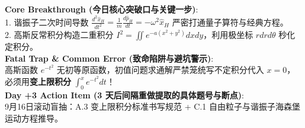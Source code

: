 \documentclass[a4paper,11pt]{article}
\begin{document}
\begin{tcolorbox}[
  enhanced, colback=white, colframe=border, boxrule=0.6pt, arc=2mm,
  left=4mm, right=4mm, top=3.0mm, bottom=3.2mm,
  fonttitle=\sffamily\bfseries\color{slate},
  title={\raisebox{0pt}{\color{forest}\rule{3pt}{10pt}}\hspace{4pt}Key Derivation Insights \& Traps \textbar\ 突破口与避坑沉淀},
  colbacktitle=paper, coltitle=slate,
  titlerule=0pt, toptitle=1.8mm, bottomtitle=1.8mm
]
\sffamily\small
\textbf{Core Breakthrough (今日核心突破口与关键一步)}:\\
1. 谐振子二次时间导数 $\frac{d^2\hat{x}_H}{dt^2} = \frac{1}{m}\frac{d\hat{p}_H}{dt} = -\omega^2 \hat{x}_H$ 严密打通量子算符与经典方程。\\
2. 高斯反常积分构造二重积分 $I^2 = \iint e^{-a(x^2+y^2)}dxdy$，利用极坐标 $rdrd\theta$ 秒化定积分。\\[4pt]
\textbf{Fatal Trap \& Common Error (致命陷阱与避坑警示)}:\\
高斯函数 $e^{-t^2}$ 无初等原函数，初值问题求通解严禁笼统写不定积分代入 $x=0$，必须用\textbf{变上限积分} $\int_0^x e^{-t^2}dt$！\\[4pt]
\textbf{Day +3 Action Item (3 天后间隔重做提取的具体题号与断点)}:\\
9月16日滚动盲抽：A.3 变上限积分标准书写规范 + C.1 自由粒子与谐振子海森堡运动方程推导。
\end{tcolorbox}
\end{document}
